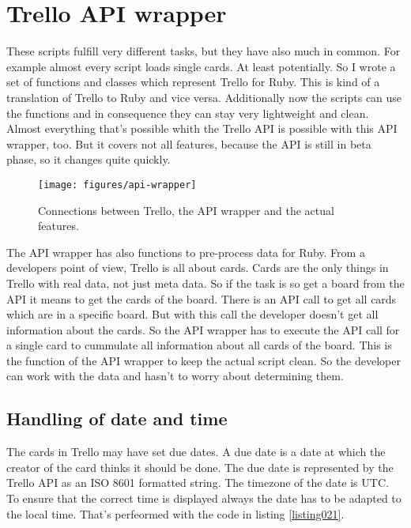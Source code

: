 
\chapter{Trello API wrapper}

These scripts fulfill very different tasks, but they have also much in common. For example almost every script loads single cards. At least potentially. So I wrote a set of functions and classes which represent Trello for Ruby. This is kind of a translation of Trello to Ruby and vice versa. Additionally now the scripts can use the functions and in consequence they can stay very lightweight and clean. Almost everything that's possible whith the Trello API is possible with this API wrapper, too. But it covers not all features, because the API is still in beta phase, so it changes quite quickly.

\begin{figure}[htb]
\centering
\texttt{[image: figures/api-wrapper]}
\caption{Connections between Trello, the API wrapper and the actual features. \cite{ruby:icon}\cite{html:logo}\cite{joomla}\cite{google} }
\label{fig: api-wrapper}
\end{figure}

The API wrapper has also functions to pre-process data for Ruby. From a developers point of view, Trello is all about cards. Cards are the only things in Trello with real data, not just meta data. So if the task is so get a board from the API it means to get the cards of the board. There is an API call to get all cards which are in a specific board. But with this call the developer doesn't get all information about the cards. So the API wrapper has to execute the API call for a single card to cummulate all information about all cards of the board. This is the function of the API wrapper to keep the actual script clean. So the developer can work with the data and hasn't to worry about determining them.

\section{Handling of date and time}
The cards in Trello may have set due dates. A due date is a date at which the creator of the card thinks it should be done. The due date is represented by the Trello API as an ISO 8601 formatted string. The timezone of the date is UTC. To ensure that the correct time is displayed always the date has to be adapted to the local time. That's perfeormed with the code in listing \ref{listing021}.

